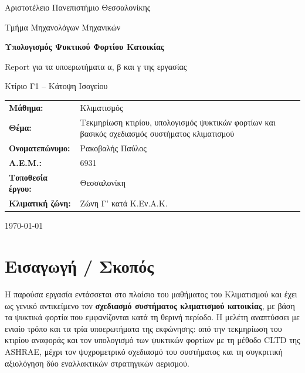 \documentclass[12pt,a4paper]{article}
\begin{document}
\begin{titlepage}
\centering

{\Large Αριστοτέλειο Πανεπιστήμιο Θεσσαλονίκης\par}
{\large Τμήμα Μηχανολόγων Μηχανικών\par}
\vspace{1.8cm}

{\LARGE\bfseries Υπολογισμός Ψυκτικού Φορτίου Κατοικίας\par}
\vspace{0.5cm}
{\Large Report για τα υποερωτήματα α, β και γ της εργασίας\par}
\vspace{0.8cm}
{\large Κτίριο Γ1 -- Κάτοψη Ισογείου\par}
\vspace{1.6cm}

\begin{tabular}{>{\bfseries}p{4.2cm}p{9.2cm}}
Μάθημα: & Κλιματισμός \\
Θέμα: & Τεκμηρίωση κτιρίου, υπολογισμός ψυκτικών φορτίων και βασικός σχεδιασμός συστήματος κλιματισμού \\
Ονοματεπώνυμο: & Ρακοβαλής Παύλος \\
Α.Ε.Μ.: & 6931 \\
Τοποθεσία έργου: & Θεσσαλονίκη \\
Κλιματική ζώνη: & Ζώνη Γ' κατά Κ.Εν.Α.Κ. \\
\end{tabular}

\vfill
{\large \today\par}
\thispagestyle{fancy}
\end{titlepage}

\tableofcontents
\newpage

\section{Εισαγωγή / Σκοπός}

Η παρούσα εργασία εντάσσεται στο πλαίσιο του μαθήματος του Κλιματισμού και έχει ως
γενικό αντικείμενο τον \textbf{σχεδιασμό συστήματος κλιματισμού κατοικίας}, με
βάση τα ψυκτικά φορτία που εμφανίζονται κατά τη θερινή περίοδο. Η μελέτη αναπτύσσει
με ενιαίο τρόπο και τα τρία υποερωτήματα της εκφώνησης: από την τεκμηρίωση του
κτιρίου αναφοράς και τον υπολογισμό των ψυκτικών φορτίων με τη μέθοδο
\textenglish{CLTD} της \textenglish{ASHRAE}, μέχρι τον ψυχρομετρικό σχεδιασμό του
συστήματος και τη συγκριτική αξιολόγηση δύο εναλλακτικών στρατηγικών αερισμού.
\end{document}

